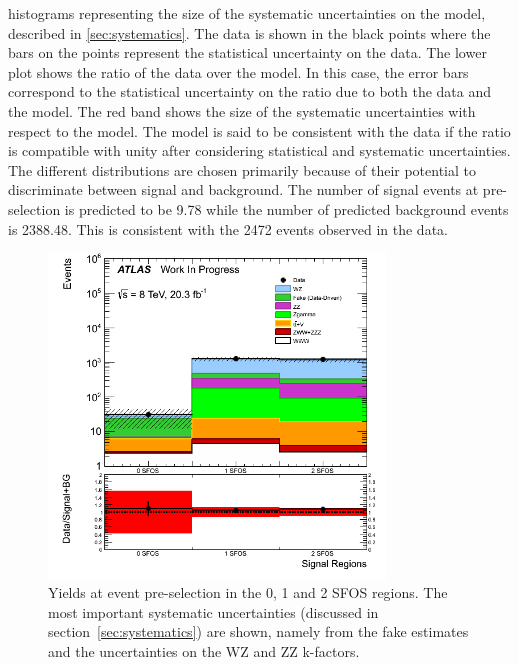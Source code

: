 histograms representing the size of the systematic uncertainties 
on the model, described in \sec\ref{sec:systematics}.
The data is shown in the black points where the 
bars on the points represent the statistical uncertainty on the data.
The lower plot shows the ratio of the data over the model.
In this case, the error bars correspond to the statistical uncertainty
on the ratio due to both the data and the model. The red band
shows the size of the systematic uncertainties with respect to the model.
The model is said to be consistent with the data
if the ratio is compatible with unity after considering statistical
and systematic uncertainties.
The different distributions are chosen primarily because 
of their potential to discriminate between signal and background. 
The number of signal events at pre-selection is predicted to be 9.78
while the number of predicted background events is 2388.48. 
This is consistent with the 2472 events observed in the data.




%



\begin{figure}[ht!]
\centering
\includegraphics[width=0.8\textwidth]{figures/SFOSPreselection.png}
\caption{Yields at event pre-selection in the 0, 1 and 2 SFOS regions.  
The most important systematic uncertainties 
(discussed in section~\ref{sec:systematics}) are shown, 
namely from the fake estimates and the uncertainties on the WZ and ZZ k-factors.}
\label{fig:preselection_nsfos}
\end{figure}

